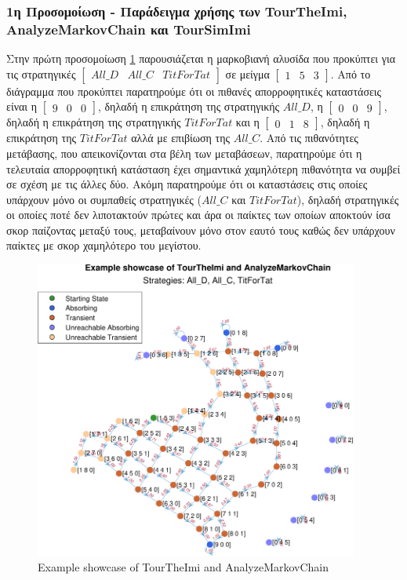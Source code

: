 \documentclass[12pt]{article}
\begin{document}
\subsubsection{1η Προσομοίωση - Παράδειγμα χρήσης των Tour\-The\-Imi, Analyze\-Markov\-Chain και Tour\-Sim\-Imi}
Στην πρώτη προσομοίωση \ref{fig:TourTheImi153} παρουσιάζεται η μαρκοβιανή αλυσίδα που προκύπτει για τις στρατηγικές $\begin{bmatrix}All\_D&All\_C&TitForTat\end{bmatrix}$ σε μείγμα $\begin{bmatrix}1&5&3\end{bmatrix}$.
Από το διάγραμμα που προκύπτει παρατηρούμε ότι οι πιθανές απορροφητικές καταστάσεις είναι η $\begin{bmatrix}9&0&0\end{bmatrix}$, δηλαδή η επικράτηση της στρατηγικής $All\_D$, η $\begin{bmatrix}0&0&9\end{bmatrix}$, δηλαδή η επικράτηση της στρατηγικής $TitForTat$ και η $\begin{bmatrix}0&1&8\end{bmatrix}$, δηλαδή η επικράτηση της $TitForTat$ αλλά με επιβίωση της $All\_C$. Από τις πιθανότητες μετάβασης, που απεικονίζονται στα βέλη των μεταβάσεων, παρατηρούμε ότι η τελευταία απορροφητική κατάσταση έχει σημαντικά χαμηλότερη πιθανότητα να συμβεί σε σχέση με τις άλλες δύο. Ακόμη παρατηρούμε ότι οι καταστάσεις στις οποίες υπάρχουν μόνο οι συμπαθείς στρατηγικές ($All\_C$ και $TitForTat$), δηλαδή στρατηγικές οι οποίες ποτέ δεν λιποτακτούν πρώτες και άρα οι παίκτες των οποίων αποκτούν ίσα σκορ παίζοντας μεταξύ τους, μεταβαίνουν μόνο στον εαυτό τους καθώς δεν υπάρχουν παίκτες με σκορ χαμηλότερο του μεγίστου.

	\begin{figure}[h]
	      \centering
	      \includegraphics[width=0.95\textwidth]{Example showcase of TourTheImi and AnalyzeMarkovChain.pdf}
	      \caption{Example showcase of TourTheImi and AnalyzeMarkovChain}
	      \label{fig:TourTheImi153}
	\end{figure}
	
\end{document}
